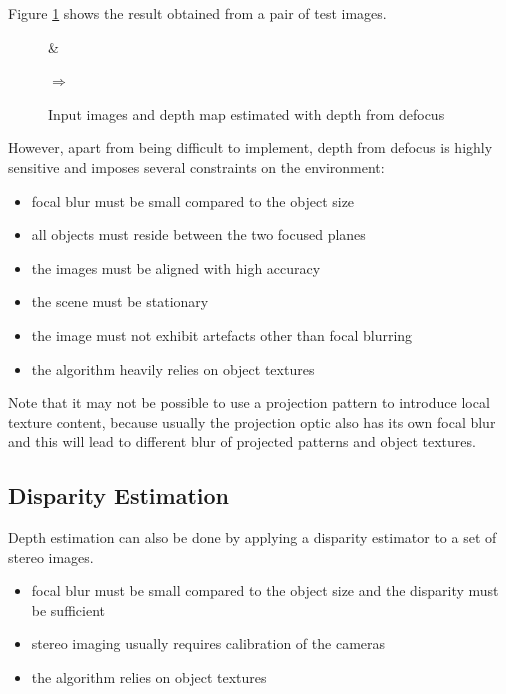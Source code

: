 \documentclass[a4paper,12pt]{book}
\begin{document}
Figure
\ref{fig:depthfromdefocus} shows the result obtained from a pair of
test images.
\begin{figure}
   \begin{center}
     \begin{minipage}[c]{.3\textwidth}
     \end{minipage}\&
     \begin{minipage}[c]{.3\textwidth}
     \end{minipage}$\Rightarrow$
     \begin{minipage}[c]{.3\textwidth}
     \end{minipage}
     \caption{Input images and depth map estimated with depth from
       defocus\label{fig:depthfromdefocus}}
   \end{center}
\end{figure}
However, apart from being difficult to implement, depth from defocus is highly
sensitive and imposes several constraints on the environment:
\begin{itemize}
\item focal blur must be small compared to the object size
\item all objects must reside between the two focused planes
\item the images must be aligned with high accuracy
\item the scene must be stationary
\item the image must not exhibit artefacts other than focal blurring
\item the algorithm heavily relies on object textures
\end{itemize}

Note that it may not be possible to use a projection pattern to introduce
local texture content, because usually the projection optic also has
its own focal blur and this will lead to different blur of projected patterns
and object textures.

\subsection{Disparity Estimation}
Depth estimation can also be done by applying a disparity estimator to
a set of stereo images. %
\begin{itemize}
\item focal blur must be small compared to the object size and the disparity
  must be sufficient
\item stereo imaging usually requires calibration of the cameras
\item the algorithm relies on object textures
\end{itemize}
\end{document}
